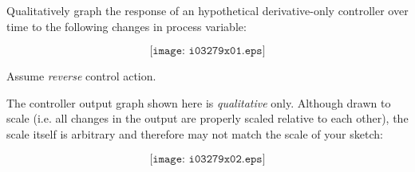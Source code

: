 

Qualitatively graph the response of an hypothetical derivative-only controller over time to the following changes in process variable:

$$\texttt{[image: i03279x01.eps]}$$

Assume {\it reverse} control action.
 






The controller output graph shown here is {\it qualitative} only.  Although drawn to scale (i.e. all changes in the output are properly scaled relative to each other), the scale itself is arbitrary and therefore may not match the scale of your sketch:

$$\texttt{[image: i03279x02.eps]}$$











